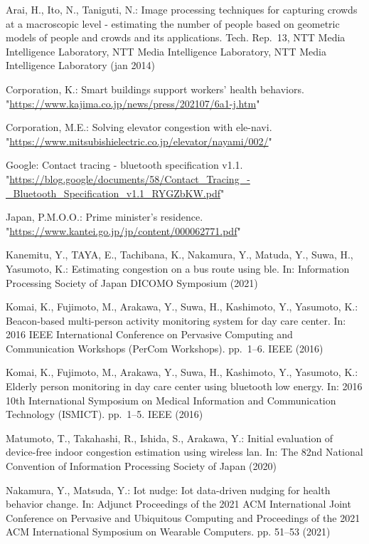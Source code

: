 \begin{thebibliography}{8}
  Arai, H., Ito, N., Taniguti, N.: Image processing techniques for capturing
  crowds at a macroscopic level - estimating the number of people based on
  geometric models of people and crowds and its applications. Tech. Rep.~13,
  NTT Media Intelligence Laboratory, NTT Media Intelligence Laboratory, NTT
  Media Intelligence Laboratory (jan 2014)

  Corporation, K.: Smart buildings support workers' health behaviors.
  "\url{https://www.kajima.co.jp/news/press/202107/6a1-j.htm}"

  Corporation, M.E.: Solving elevator congestion with ele-navi.
  "\url{https://www.mitsubishielectric.co.jp/elevator/nayami/002/}"

  Google: Contact tracing - bluetooth specification v1.1.
  "\url{https://blog.google/documents/58/Contact\_Tracing\_-\_Bluetooth\_Specification\_v1.1\_RYGZbKW.pdf}"

  Japan, P.M.O.O.: Prime minister's residence.
  "\url{https://www.kantei.go.jp/jp/content/000062771.pdf}"

  Kanemitu, Y., TAYA, E., Tachibana, K., Nakamura, Y., Matuda, Y., Suwa, H.,
  Yasumoto, K.: Estimating congestion on a bus route using ble. In: Information
  Processing Society of Japan DICOMO Symposium (2021)

  Komai, K., Fujimoto, M., Arakawa, Y., Suwa, H., Kashimoto, Y., Yasumoto, K.:
  Beacon-based multi-person activity monitoring system for day care center. In:
  2016 IEEE International Conference on Pervasive Computing and Communication
  Workshops (PerCom Workshops). pp.~1--6. IEEE (2016)

  Komai, K., Fujimoto, M., Arakawa, Y., Suwa, H., Kashimoto, Y., Yasumoto, K.:
  Elderly person monitoring in day care center using bluetooth low energy. In:
  2016 10th International Symposium on Medical Information and Communication
  Technology (ISMICT). pp.~1--5. IEEE (2016)

  Matumoto, T., Takahashi, R., Ishida, S., Arakawa, Y.: Initial evaluation of
  device-free indoor congestion estimation using wireless lan. In: The 82nd
  National Convention of Information Processing Society of Japan (2020)

  Nakamura, Y., Matsuda, Y.: Iot nudge: Iot data-driven nudging for health
  behavior change. In: Adjunct Proceedings of the 2021 ACM International Joint
  Conference on Pervasive and Ubiquitous Computing and Proceedings of the 2021
  ACM International Symposium on Wearable Computers. pp. 51--53 (2021)


\end{thebibliography}
